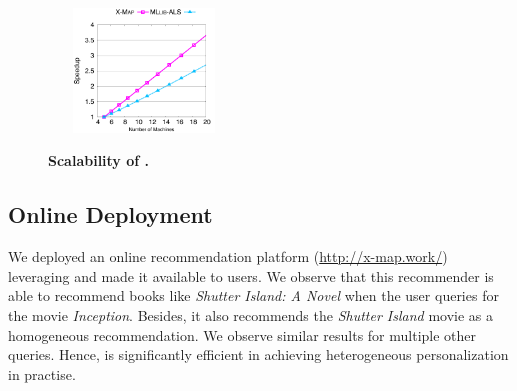 \begin{figure}[ht]
\vspace{-2mm}
\begin{center}
\includegraphics[height=1.3in,width=2in]{figures/Scalability.pdf}
\vspace{-4mm}
\caption{{\bf Scalability of \crossrec.}}
\vspace{-6mm}
\label{fig:scalability}
\end{center}
\end{figure}


\subsection{Online Deployment}
We deployed an online recommendation platform (\url{http://x-map.work/}) leveraging \graphsim and made it available to users. We observe that this recommender is able to recommend books like \emph{Shutter Island: A Novel} when the user queries for the movie \emph{Inception}. Besides, it also recommends the \emph{Shutter Island} movie as a homogeneous recommendation. We observe similar results for multiple other queries. Hence, \graphsim is significantly efficient in achieving heterogeneous personalization in practise.

